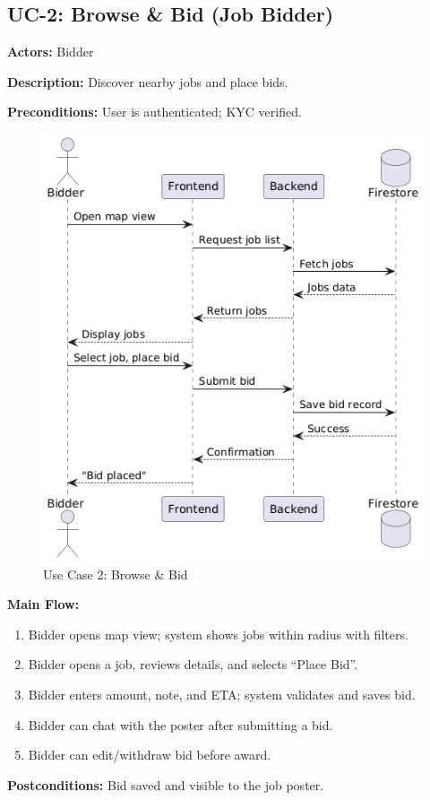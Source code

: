 \documentclass[11pt]{article}
\begin{document}
\subsection{UC-2: Browse \& Bid (Job Bidder)}
\textbf{Actors:} Bidder \par
\textbf{Description:} Discover nearby jobs and place bids. \par
\textbf{Preconditions:} User is authenticated; KYC verified. \par
\begin{figure}[htbp]
  \centering
\includegraphics[width=0.75\linewidth]{UC-2.png}
  \caption{Use Case 2: Browse \& Bid}
  \label{fig:uc2}
\end{figure} \par
\textbf{Main Flow:}
\begin{enumerate}[leftmargin=1.4em]
  \item Bidder opens map view; system shows jobs within radius with filters.
  \item Bidder opens a job, reviews details, and selects ``Place Bid''.
  \item Bidder enters amount, note, and ETA; system validates and saves bid.
  \item Bidder can chat with the poster after submitting a bid.
  \item Bidder can edit/withdraw bid before award.
\end{enumerate}
\textbf{Postconditions:} Bid saved and visible to the job poster.
\end{document}
